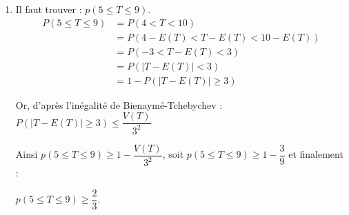 \documentclass[10pt]{article}
\begin{document}
\begin{enumerate}
\begin{enumerate}
$\bullet~~E(T) = E(T_1) + E(T_2) = 4 + 3 = 7$ et $T_1$ et $T_2$ sont deux variables indépendantes, donc 

$\bullet~~V(T) = V(T_1) + V(T_2) = 2 + 1 = 3$.
		\item Il faut trouver : $p(5\leqslant T \leqslant 9)$.
\begin{align*} P(5 \leqslant T \leqslant 9) &= P(4 < T < 10) \\ &= P(4 - E(T) < T - E(T) < 10 - E(T)) \\ &= P(-3 < T - E(T) < 3) \\ &= P(|T - E(T)| < 3) \\ &= 1 - P(|T - E(T)| \geqslant 3) \end{align*}

Or, d'après l'inégalité de Bienaymé-Tchebychev : $ P(|T - E(T)| \geqslant 3)\leqslant \dfrac{V(T)}{3^2}$

Ainsi $p(5\leqslant T \leqslant 9) \geqslant 1 - \dfrac{V(T)}{3^2}$, soit $p(5\leqslant T \leqslant 9) \geqslant 1 - \dfrac39$ et finalement :

$p(5\leqslant T \leqslant 9) \geqslant \dfrac23$.

	\end{enumerate}
\end{enumerate}

\bigskip
\end{document}

